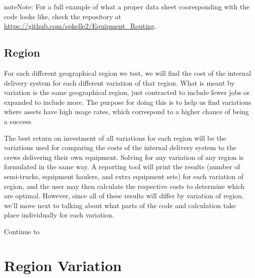 \documentclass[letterpaper,10pt,english]{sphinxmanual}
\begin{document}
\noindent{}

\noindent{}

\begin{sphinxadmonition}{note}{Note:}
For a full example of what a proper data sheet cooresponding with the code
looks like, check the repository at
\url{https://github.com/spkelle2/Equipment\_Routing}.
\end{sphinxadmonition}


\section{Region}
\label{\detokenize{main:region}}
For each different geographical region we test, we will find the cost of the
internal delivery system for each different variation of that region. What is
meant by variation is the same geographical region, just contracted to include
fewer jobs or expanded to include more. The purpose for doing this is to help
us find variations where assets have high usage rates, which correspond to a
higher chance of being a success.

The best return on investment of all variations for each region will be the
variations used for comparing the costs of the internal delivery system to
the crews delivering their own equipment. Solving for any variation of any
region is formulated in the same way. A reporting tool will print the results
(number of semi-trucks, equipment haulers, and extra equipment sets) for
each variation of region, and the user may then calculate the respective
costs to determine which are optimal. However, since all of these results
will differ by variation of region, we'll move next to talking about what
parts of the code and calculation take place individually for each variation.

Continue to {\hyperref[\detokenize{variation:variation}]{}}


\chapter{Region Variation}
\label{\detokenize{variation:region-variation}}\label{\detokenize{variation::doc}}\label{\detokenize{variation:variation}}
\end{document}
